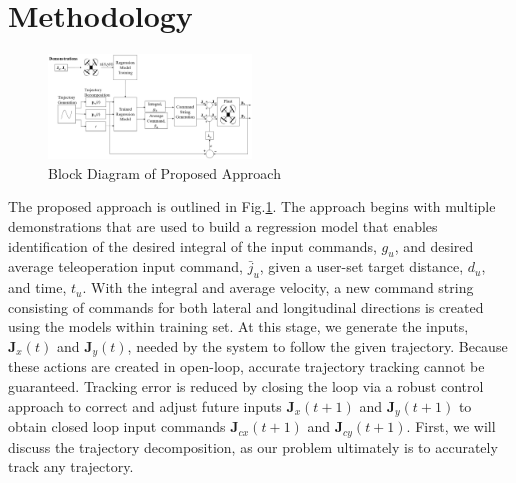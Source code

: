 \documentclass[letterpaper, 10 pt, conference]{ieeeconf}  %
\newcommand\NB[1]{$\spadesuit$\footnote{NB: #1}}
\begin{document}
\section{Methodology} \label{sec:approach}

\begin{figure}[ht]
    \includegraphics[width=0.48\textwidth]{images/blocks.PNG}
    \caption{Block Diagram of Proposed Approach}
    \label{fig:blockdiagram}
\end{figure}


The proposed approach is outlined in Fig.\ref{fig:blockdiagram}. The approach begins with multiple demonstrations that are used to build a regression model that enables identification of the desired integral of the input commands, $g_u$, and desired average teleoperation input command, $\bar{j}_u$, given a user-set target distance, $d_u$, and time, $t_u$. With the integral and average velocity, a new command string consisting of commands for both lateral and longitudinal directions is created using the models within training set. At this stage, we generate the inputs, $\mathbf{J}_x(t)$ and $\mathbf{J}_y(t)$, needed by the system to follow the given trajectory. Because these actions are created in open-loop, accurate trajectory tracking cannot be guaranteed. Tracking error is reduced by closing the loop via a robust control approach to correct and adjust future inputs $\mathbf{J}_x(t+1)$ and $\mathbf{J}_y(t+1)$ to obtain closed loop input commands $\mathbf{J}_{cx}(t+1)$ and $\mathbf{J}_{cy}(t+1)$. First, we will discuss the trajectory decomposition, as our problem ultimately is to accurately track any trajectory.


\end{document}

